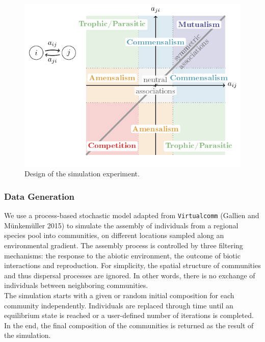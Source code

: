 \documentclass[10pt,a4paper]{article}
\begin{document}
\begin{figure}[bthp]
  \centering
  \includegraphics[page=4]{tikz_figures.pdf}
  \caption{Design of the simulation experiment.}
  \label{simexp}
\end{figure}



\subsubsection{Data Generation}
We use a process-based stochastic model adapted from \texttt{Virtualcomm} (Gallien and Münkemüller 2015) to simulate the assembly of individuals from a regional species pool into communities, on different locations sampled along an environmental gradient. The assembly process is controlled by three filtering mechanisms: the response to the abiotic environment, the outcome of biotic interactions and reproduction.  For simplicity, the spatial structure of communities and thus dispersal processes are ignored. In other words, there is no exchange of individuals between neighboring communities.\\

The simulation starts with a given or random initial composition for each community independently. Individuals are replaced through time until an equilibrium state is reached or a user-defined number of iterations is completed. In the end, the final composition of the communities is returned as the result of the simulation.
\end{document}
